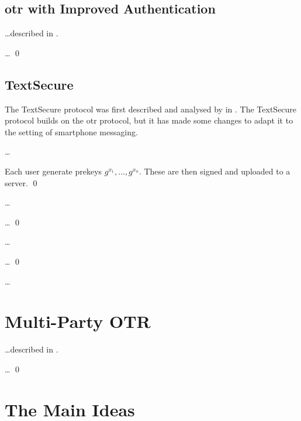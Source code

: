 \subsection{\acs{otr} with Improved Authentication}

\dots described in \cite{otr2007}.

\begin{protocol}
  \dots
  \qed
\end{protocol}

\subsection{TextSecure}

The TextSecure protocol was first described and analysed by 
\citeauthor{frosch2014secure} in \cite{frosch2014secure}.
The TextSecure protocol builds on the \ac{otr} protocol, but it has made some 
changes to adapt it to the setting of smartphone messaging.

\dots

\begin{protocol}
  Each user generate prekeys \(g^{x_1}, \ldots, g^{x_n}\).
  These are then signed and uploaded to a server.
  \qed
\end{protocol}

\dots

\begin{protocol}
  \dots
  \qed
\end{protocol}

\dots

\begin{protocol}
  \dots
  \qed
\end{protocol}

\dots


\section{Multi-Party \acs{OTR}}

\dots described in \cite{multiotr2009}.

\begin{protocol}
  \dots
  \qed
\end{protocol}


\section{The Main Ideas}

